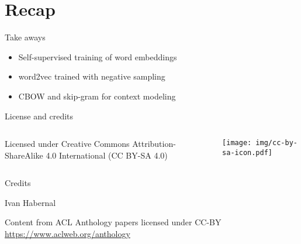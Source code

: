 \documentclass[12pt,aspectratio=169,handout]{beamer}
\begin{document}
\section*{Recap}



\begin{frame}{Take aways}
	
\begin{itemize}
	\item Self-supervised training of word embeddings
	\item word2vec trained with negative sampling
	\item CBOW and skip-gram for context modeling
\end{itemize}
	
\end{frame}



\begin{frame}{License and credits}

	\begin{columns}
		\begin{column}{0.7\textwidth}
			Licensed under Creative Commons Attribution-ShareAlike 4.0 International (CC BY-SA 4.0)
		\end{column}
		\begin{column}{0.2\textwidth}
			\texttt{[image: img/cc-by-sa-icon.pdf]}
		\end{column}
	\end{columns}
	
	\bigskip
	
	Credits
	
	\begin{scriptsize}
		
		Ivan Habernal
		
		Content from ACL Anthology papers licensed under CC-BY \url{https://www.aclweb.org/anthology}
		
	
	\end{scriptsize}
	
\end{frame}
\end{document}
